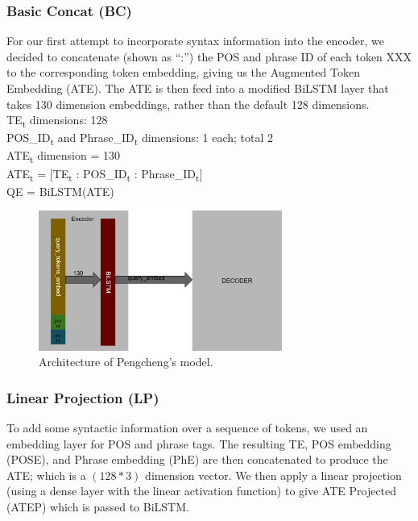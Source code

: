 \documentclass{IEEEtran}
\begin{document}
        \subsubsection{Basic Concat (BC)}
        For our first attempt to incorporate syntax information into the encoder, we decided to 
        concatenate (shown as ``:'') the POS and phrase ID of each token XXX to the corresponding 
        token embedding, giving us the Augmented Token Embedding (ATE). The ATE is then feed into 
        a modified BiLSTM
        layer that takes 130 dimension embeddings, rather than the default 128 dimensions. \\

        \hspace*{-3.5mm}TE\textsubscript{t} dimensions: 128 \\
        POS\_ID\textsubscript{t} and Phrase\_ID\textsubscript{t} dimensions: 1 each; total 2 \\
        ATE\textsubscript{t} dimension = 130 \\

        \hspace*{-3.5mm}ATE\textsubscript{t} = [TE\textsubscript{t} : 
        POS\_ID\textsubscript{t} : Phrase\_ID\textsubscript{t}] \\
        QE = BiLSTM(ATE) \\

        \begin{figure}[h]
          \centering
          \includegraphics[width=8cm]{bc.png}
          \caption{Architecture of Pengcheng's model.}
          \label{fig:bc}
        \end{figure}

        \subsubsection{Linear Projection (LP)}
        To add some syntactic information over a sequence of tokens, we used an embedding layer for
        POS and phrase tags. The resulting TE, POS embedding (POSE), and Phrase embedding (PhE) are
        then concatenated to produce the ATE; which is a $ (128 * 3) $ dimension vector. We then
        apply a linear projection (using a dense layer with the linear activation function) to 
        give ATE Projected (ATEP) which is passed to BiLSTM. \\
\end{document}

